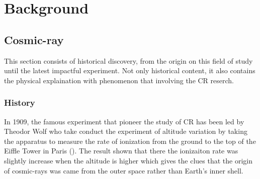 \chapter{Background}


\section{Cosmic-ray}

This section consists of historical discovery, from the origin
on this field of study until the latest impactful experiment.
Not only historical content, it also contains the physical
explaination with phenomenon that involving the CR reserch.

\subsection{History}
In 1909, the famous experiment that pioneer the study of CR has been
led by Theodor Wolf who take conduct the experiment of 
altitude variation by taking the apparatus to measure 
the rate of ionization from the ground to the top of 
the Eiffle Tower in Paris (\cite{gray1949cosmic}).
The result shown that there the ionizaiton rate was slightly
increase when the altitude is higher which gives the clues
that the origin of cosmic-rays was came from the outer space
rather than Earth's inner shell. \cite{EarlyCRGerman}


